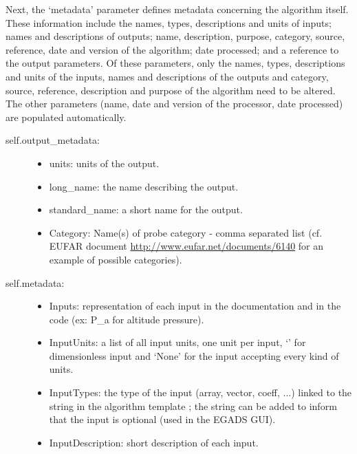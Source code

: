 \documentclass[a4paper,10pt,openany,english]{sphinxmanual}
\begin{document}
\begin{enumerate}
\begin{description}
Next, the `metadata' parameter defines metadata concerning the algorithm itself. These information include the names, types, descriptions and units of inputs; names and descriptions of outputs; name, description, purpose, category, source, reference, date and version of the algorithm; date processed; and a reference to the output parameters. Of these parameters, only the names, types, descriptions and units of the inputs, names and descriptions of the outputs and category, source, reference, description and purpose of the algorithm need to be altered. The other parameters (name, date and version of the processor, date processed) are populated automatically.
\begin{description}
\item[{self.output\_metadata:}] \leavevmode\begin{itemize}
\item {} 
units: units of the output.

\item {} 
long\_name: the name describing the output.

\item {} 
standard\_name: a short name for the output.

\item {} 
Category: Name(s) of probe category - comma separated list (cf. EUFAR document \url{http://www.eufar.net/documents/6140} for an example of possible categories).

\end{itemize}

\item[{self.metadata:}] \leavevmode\begin{itemize}
\item {} 
Inputs: representation of each input in the documentation and in the code (ex: P\_a for altitude pressure).

\item {} 
InputUnits: a list of all input units, one unit per input, `' for dimensionless input and `None' for the input accepting every kind of units.

\item {} 
InputTypes: the type of the input (array, vector, coeff, ...) linked to the  string in the algorithm template ; the string  can be added to inform that the input is optional (used in the EGADS GUI).

\item {} 
InputDescription: short description of each input.


\end{itemize}
\end{description}
\end{description}
\end{enumerate}
\end{document}
